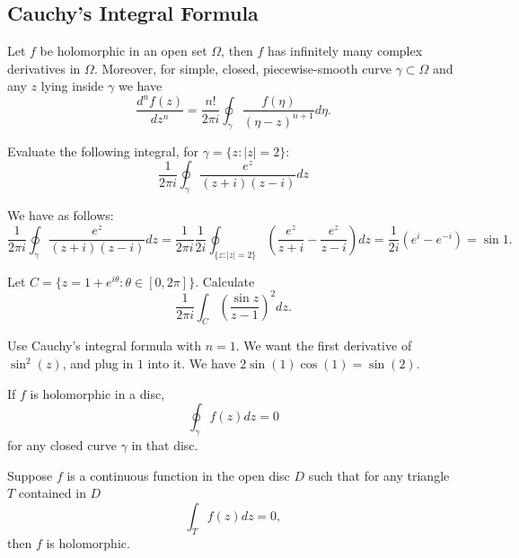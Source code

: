 \subsection{Cauchy's Integral Formula}

\begin{theorem}[Cauchy]
    Let $f$ be holomorphic in an open set $\Omega$, then  $f$ has infinitely many 
    complex derivatives in $\Omega$. Moreover, for simple, closed, piecewise-smooth curve 
    $\gamma \subset \Omega$ and any $z$ lying inside $\gamma$ we have
    \[
    \frac{d^nf(z)}{dz^n} = \frac{n!}{2 \pi i} \oint_{\gamma} \frac{f(\eta)}{(\eta - z)^{n + 1}} d\eta.
    \]
\end{theorem}

\begin{exercise}
    Evaluate the following integral, for $\gamma = \{ z \colon |z| = 2\}$:
    \[
    \frac{1}{2 \pi i} \oint_{\gamma} \frac{e^z}{(z + i)(z - i)} dz
    \]
\end{exercise}
\begin{solution}
    We have as follows:
    \[
    \frac{1}{2 \pi i} \oint_{\gamma} \frac{e^z}{(z + i)(z - i)} dz = \frac{1}{2 \pi i} \frac{1}{2i} \oint_{\{ z \colon |z| = 2\}} \left( \frac{e^z}{z + i} - \frac{e^z}{z - i} \right) dz = \frac{1}{2i} (e^i - e^{-i}) = \sin 1.
    \]
\end{solution}

\begin{exercise}
Let $C = \{z = 1 + e^{i \theta} \colon \theta \in [0,2\pi]\}$. Calculate
\[
\frac{1}{2\pi i} \int_C \left(\frac{\sin z}{z - 1}\right)^2 dz.
\]
\end{exercise}
\begin{solution}
Use Cauchy's integral formula with $n = 1$. We want the first derivative of $\sin^2(z)$,
and plug in $1$ into it. We have $2 \sin(1)\cos(1) = \sin(2)$.
\end{solution}

\begin{corollary}
If $f$ is holomorphic in a disc,
\[
\oint_{\gamma} f(z) dz = 0
\]
for any closed curve $\gamma$ in that disc. 
\end{corollary}


\begin{theorem}[Morera]
    Suppose $f$ is a continuous function in the open disc $D$ such that 
    for any triangle $T$ contained in $D$
    \[
    \int_T f(z) dz = 0,
    \]
    then $f$ is holomorphic.
\end{theorem}


